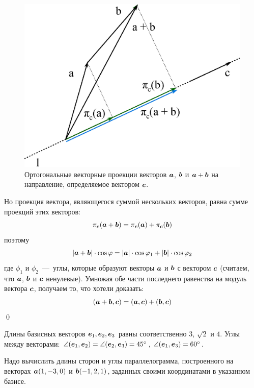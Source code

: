 \documentclass[a4paper,12pt]{article}
\begin{document}
  \begin{figure}[h]
    \centering
    
    \includegraphics[width=0.5\columnwidth]{sum-of-projections}
    
    \caption{Ортогональные векторные проекции векторов $\boldsymbol a$, $\boldsymbol b$ и $\bds a \hm+ \bds b$ на направление, определяемое вектором $\boldsymbol c$.}
    \label{fig:sum-of-projections}
  \end{figure}
  
  Но проекция вектора, являющегося суммой нескольких векторов, равна сумме проекций этих векторов:
  \[
    \pi_{\boldsymbol c}(\boldsymbol a + \boldsymbol b) = \pi_{\boldsymbol c}(\boldsymbol a) + \pi_{\boldsymbol c}(\boldsymbol b)
  \]
  поэтому
  \[
    |\boldsymbol a + \boldsymbol b| \cdot \cos \varphi = |\boldsymbol a| \cdot \cos \varphi_1 + |\boldsymbol b| \cdot \cos \varphi_2
  \]
  где $\phi_1$ и $\phi_2$~---~углы, которые образуют векторы $\boldsymbol a$ и $\boldsymbol b$ с вектором $\boldsymbol c$ (считаем, что $\boldsymbol a$, $\boldsymbol b$ и $\boldsymbol c$ ненулевые).
  Умножая обе части последнего равенства на модуль вектора $\boldsymbol c$, получаем то, что хотели доказать:
  \[
    (\boldsymbol a + \boldsymbol b, \boldsymbol c) = (\boldsymbol a, \boldsymbol c) + (\boldsymbol b, \boldsymbol c)
  \]
  \qed
  
  
  \begin{problem}[2.21]
    Длины базисных векторов $\boldsymbol e_1, \boldsymbol e_2, \boldsymbol e_3$ равны соответственно $3$, $\sqrt{2}$ и $4$.
    Углы между векторами: $\angle (\bds e_1, \bds e_2) \hm= \angle (\bds e_2, \bds e_3) \hm= 45\degree$, $\angle (\bds e_1, \bds e_3) \hm= 60\degree$.
    
    Надо вычислить длины сторон и углы параллелограмма, построенного на векторах $\boldsymbol a (1, -3, 0)$ и $\boldsymbol b (-1, 2, 1)$, заданных своими координатами в указанном базисе.
  \end{problem}
  
\end{document}
